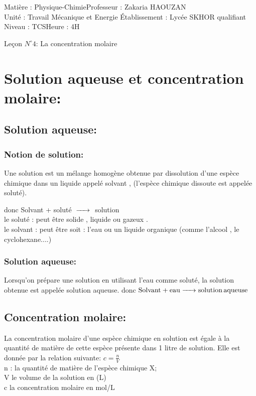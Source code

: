 \documentclass[12pt]{article}
\author{Zakaria HAOUZAN}
\date{\today}
\newcommand\headerMe[2]{\noindent{}#1\hfill#2}
\begin{document}
\headerMe{Matière : Physique-Chimie}{Professeur : Zakaria HAOUZAN}\\
\headerMe{Unité : Travail Mécanique et Energie }{Établissement : Lycée SKHOR qualifiant}\\
\headerMe{Niveau : TCS}{Heure : 4H}\\

\begin{center}

    \Large{Leçon $N^{\circ} 4 $: \color{red} La concentration molaire }
\end{center}


\section{Solution aqueuse et concentration molaire: }
\subsection{Solution aqueuse: }
\subsubsection{Notion de solution:}
Une solution est un mélange homogène obtenue par dissolution d'une espèce chimique dans un liquide appelé
solvant , (l'espèce chimique dissoute est appelée soluté).

donc Solvant + soluté $\ce{ -> }$ solution
\\le soluté : peut être solide , liquide ou gazeux .
\\le solvant : peut être soit : l'eau ou un liquide organique (comme l'alcool , le cyclohexane....)
\subsubsection{Solution aqueuse:}
Lorsqu'on prépare une solution en utilisant l'eau comme soluté, la solution obtenue est appelée solution aqueuse.
donc $\ce{Solvant + eau -> solution aqueuse}$

\subsection{Concentration molaire: }
La concentration molaire d'une espèce chimique en solution est égale à la quantité de matière de cette espèce
présente dans 1 litre de solution.
Elle est donnée par la relation suivante: $c = \frac{n}{V}$
\\n : la quantité de matière de l'espèce chimique X;
\\V le volume de la solution en (L)
\\c la concentration molaire en mol/L
\end{document}
